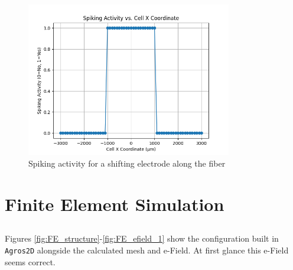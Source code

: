 \documentclass{article}
\begin{document}
    \begin{figure}[h]
        \centering
        \includegraphics[width=0.8\textwidth]{spiking_activity}
        \caption{Spiking activity for a shifting electrode along the fiber}
        \label{fig:spiking_activity}
    \end{figure}


    \section{Finite Element Simulation}

    \subsection{}

    Figures \ref{fig:FE_structure}-\ref{fig:FE_efield_1} show the configuration built in \texttt{Agros2D} alongside the calculated mesh and e-Field.
    At first glance this e-Field seems correct.
\end{document}
